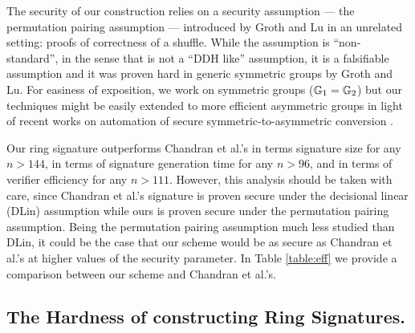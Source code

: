 The security of our construction relies on a security assumption --- the {permutation pairing assumption} --- introduced by Groth and Lu \cite{AC:GroLu07} in an unrelated setting: proofs of correctness of a shuffle. While the assumption is ``non-standard'', in the sense that is not a ``DDH like'' assumption, it is a falsifiable assumption and it was proven hard in generic symmetric groups by Groth and Lu. For easiness of exposition, we work on symmetric groups ($\mathbb{G}_1=\mathbb{G}_2$) but our techniques might be easily extended to more efficient asymmetric groups in light of recent works on automation of secure symmetric-to-asymmetric conversion \cite{C:AGOT14a,C:AbeHosOhk16,CCS:AkiGarHoh15}.

Our ring signature outperforms Chandran et al.'s in terms signature size for any $n > 144$, in terms of signature generation time for any $n>96$, and in terms of verifier efficiency for any $n>111$. However, this analysis should be taken with care, since Chandran et al.'s signature is proven secure under the decisional linear (DLin) assumption while ours is proven secure under the permutation pairing assumption. Being the permutation pairing assumption much less studied than DLin, it could be the case that our scheme would be as secure as Chandran et al.'s at higher values of the security parameter. In Table \ref{table:eff} we provide a comparison between our scheme and Chandran et al.'s.


%

\subsection{The Hardness of constructing Ring Signatures.}

